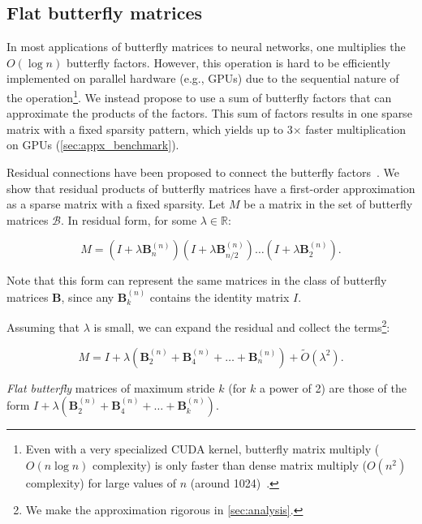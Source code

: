 \subsection{Flat butterfly matrices}
\label{sec:flat_butterfly}
In most applications of butterfly matrices to neural networks, one multiplies the $O(\log n)$ butterfly factors. However, this operation is hard to be efficiently implemented on parallel hardware (e.g., GPUs) due to the sequential nature of the operation\footnote{Even with a very specialized CUDA kernel, butterfly matrix multiply ($O(n \log n)$ complexity) is only faster than dense matrix multiply ($O(n^2)$ complexity) for large values of $n$ (around 1024)~\citep{dao2019learning}.}. We instead propose to use a sum of butterfly factors that can approximate the products of the factors. This sum of factors results in one sparse matrix with a fixed sparsity pattern, which yields up to 3$\times$ faster multiplication on GPUs (\ref{sec:appx_benchmark}).

Residual connections have been proposed to connect the butterfly factors~\citep{vahid2020butterfly}. We show that residual products of butterfly matrices have a first-order approximation as a sparse matrix with a fixed sparsity. Let $M$ be a matrix in the set of butterfly matrices $\mathcal{B}$.
In residual form, for some $\lambda \in \mathbb{R}$:

\begin{equation}
  \label{eq:residual_butterfly}
  M = (I + \lambda \mathbf{B}_n^{(n)}) (I + \lambda \mathbf{B}_{n/2}^{(n)}) \dots (I + \lambda \mathbf{B}_2^{(n)}).
\end{equation}

Note that this form can represent the same matrices in the class of butterfly matrices $\mathbf{B}$, since any $\mathbf{B}_k^{(n)}$ contains the identity matrix $I$.

Assuming that $\lambda$ is small, we can expand the residual and collect the
terms\footnote{We make the approximation rigorous in \ref{sec:analysis}.}:

\begin{equation*}
  M = I + \lambda (\mathbf{B}_2^{(n)} + \mathbf{B}_{4}^{(n)} + \dots + \mathbf{B}_n^{(n)}) + \widetilde{O}(\lambda^2).
\end{equation*}

\begin{definition}
  \label{def:flat_butterfly}
  \emph{Flat butterfly} matrices of maximum stride $k$ (for $k$ a power of 2) are those of the form $I + \lambda (\mathbf{B}_2^{(n)} + \mathbf{B}_{4}^{(n)} + \dots + \mathbf{B}_k^{(n)})$.
\end{definition}

